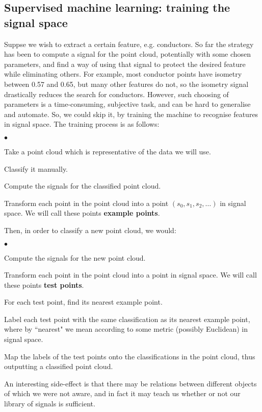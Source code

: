 \documentclass[a4paper,11pt,twoside]{article}
\theoremstyle{definition}
\theoremstyle{remark}
\begin{document}
\subsection{Supervised machine learning: training the signal space}
Suppse we wish to extract a certain feature, e.g. conductors. So far the strategy has been to compute a signal for the point cloud, potentially with some chosen parameters, and find a way of using that signal to protect the desired feature while eliminating others. For example, most conductor points have isometry between 0.57 and 0.65, but many other features do not, so the isometry signal drastically reduces the search for conductors. However, such choosing of parameters is a time-consuming, subjective task, and can be hard to generalise and automate. So, we could skip it, by training the machine to recognise features in signal space. The training process is as follows:
\begin{list}{$\bullet$}{}
\item Take a point cloud which is representative of the data we will use. 
\item Classify it manually.
\item Compute the signals for the classified point cloud. 
\item Transform each point in the point cloud into a point $(s_0,s_1,s_2,\dots)$ in signal space. We will call these points \textbf{example points}.
\end{list}
Then, in order to classify a new point cloud, we would:
\begin{list}{$\bullet$}{}
\item Compute the signals for the new point cloud.
\item Transform each point in the point cloud into a point in signal space. We will call these points \textbf{test points}.
\item For each test point, find its nearest example point.
\item Label each test point with the same classification as its nearest example point, where by ``nearest" we mean according to some metric (possibly Euclidean) in signal space.
\item Map the labels of the test points onto the classifications in the point cloud, thus outputting a classified point cloud.
\end{list}
An interesting side-effect is that there may be relations between different objects of which we were not aware, and in fact it may teach us whether or not our library of signals is sufficient.
\end{document}

